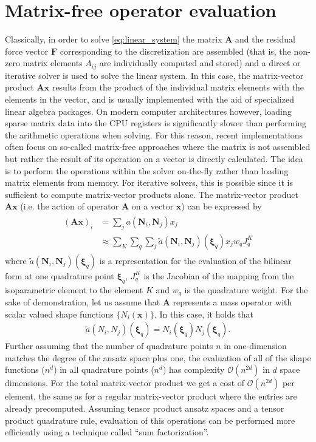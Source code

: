 \documentclass[AMA,STIX1COL]{WileyNJD-v2}
\newcommand*{\gz}[1]{\boldsymbol{#1}}
\begin{document}
\section{Matrix-free operator evaluation}
\label{sec:mf}
Classically, in order to solve \eqref{eq:linear_system} the matrix $\gz A$ and the residual force vector $\gz F$ corresponding to the discretization are assembled (that is, the non-zero matrix elements $A_{ij}$ are individually computed and stored) and a direct or iterative solver is used to solve the linear system.
In this case, the matrix-vector product $\gz A \gz x$ results from the product of the individual matrix elements with the elements in the vector, and is usually implemented with the aid of specialized linear algebra packages.
On modern computer architectures however, loading sparse matrix data into the CPU registers is significantly slower than performing the arithmetic operations when solving.
For this reason, recent implementations often focus on so-called matrix-free approaches \cite{kronbichler12, kronbichler2017fast} where the matrix is not assembled but rather the result of its operation on a vector is directly calculated.
The idea is to perform the operations within the solver on-the-fly rather than loading matrix elements from memory.
For iterative solvers, this is possible since it is sufficient to compute matrix-vector products alone.
%
The matrix-vector product $\gz A \gz x$ (i.e. the action of operator $\gz A$ on a vector $\gz x$) can be expressed by
\begin{align}
  \begin{split}
 (\gz A \gz x)_i &= \sum_j a(\gz N_i,\gz N_j) x_j \\
        &\approx \sum_K \sum_q \sum_j \tilde{a}(\gz N_i,\gz N_j)(\gz \xi_q) x_j w_q J^K_q
  \end{split}
  \label{eq:mf_vmult}
\end{align}
where $\tilde{a}(\gz N_i,\gz N_j)(\gz \xi_q)$ is a representation for the evaluation of the bilinear form at one quadrature point $\gz \xi_q$, $J^K_q$ is the Jacobian of the mapping from the isoparametric element to the element $K$ and
$w_q$ is the quadrature weight.
For the sake of demonstration, let us assume that $\gz A$ represents a mass operator with scalar valued shape functions $\{ N_i(\gz x) \}$. In this case, it holds that
\begin{align*}
 \tilde{a}(N_i,N_j)(\gz \xi_q) = N_i(\gz \xi_q)N_j(\gz \xi_q).
\end{align*}
Further assuming that the number of quadrature points $n$ in one-dimension matches the degree of the ansatz space plus one, the evaluation of all of the shape functions ($n^d$)
in all quadrature points ($n^d$) has complexity $\mathcal{O}(n^{2d})$ in $d$ space dimensions.
For the total matrix-vector product we get a cost of $\mathcal{O}(n^{2d})$ per element,
the same as for a regular matrix-vector product where the entries are already precomputed. Assuming tensor product ansatz spaces and a tensor product quadrature rule, evaluation of this operations can be performed more efficiently using a technique called ``sum factorization''.
\end{document}
